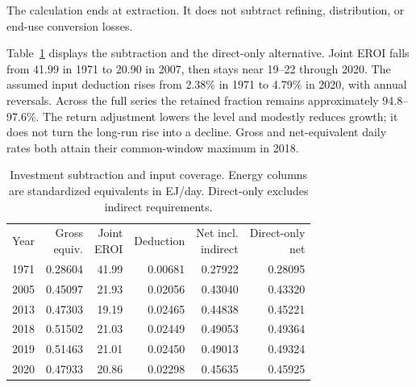\documentclass[reprint,aps,pra,longbibliography,floatfix]{revtex4-2}
\begin{document}
The calculation ends at extraction. It does not subtract refining, distribution, or end-use conversion losses.

Table~\ref{tab:investment} displays the subtraction and the direct-only alternative. Joint EROI falls from 41.99 in 1971 to 20.90 in 2007, then stays near 19--22 through 2020. The assumed input deduction rises from 2.38\% in 1971 to 4.79\% in 2020, with annual reversals. Across the full series the retained fraction remains approximately 94.8--97.6\%. The return adjustment lowers the level and modestly reduces growth; it does not turn the long-run rise into a decline. Gross and net-equivalent daily rates both attain their common-window maximum in 2018.

\begin{table}[tb]\centering\small\setlength{\tabcolsep}{2.8pt}
\caption{Investment subtraction and input coverage. Energy columns are standardized equivalents in EJ/day. Direct-only excludes indirect requirements.}\label{tab:investment}
\begin{ruledtabular}\begin{tabular}{rrrrrr}
Year & \shortstack{Gross\\equiv.} & \shortstack{Joint\\EROI} & Deduction & \shortstack{Net incl.\\indirect} & \shortstack{Direct-only\\net}\\
1971 & 0.28604 & 41.99 & 0.00681 & 0.27922 & 0.28095 \\
2005 & 0.45097 & 21.93 & 0.02056 & 0.43040 & 0.43320 \\
2013 & 0.47303 & 19.19 & 0.02465 & 0.44838 & 0.45221 \\
2018 & 0.51502 & 21.03 & 0.02449 & 0.49053 & 0.49364 \\
2019 & 0.51463 & 21.01 & 0.02450 & 0.49013 & 0.49324 \\
2020 & 0.47933 & 20.86 & 0.02298 & 0.45635 & 0.45925 \\
\end{tabular}\end{ruledtabular}\end{table}
\end{document}
